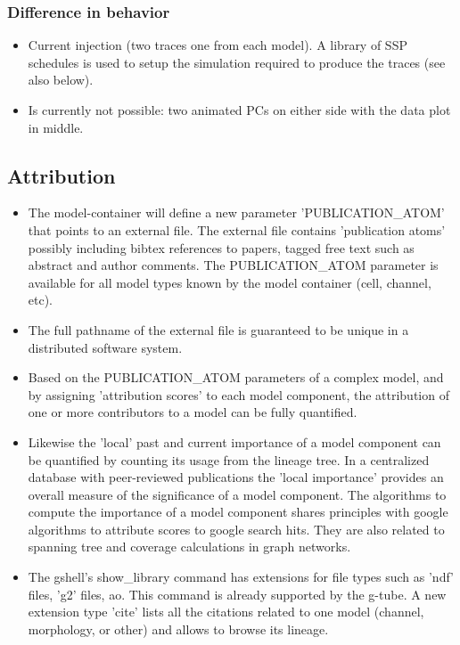 \documentclass[12pt]{article}
\begin{document}
\subsubsection{Difference in behavior}
\begin{itemize}
\item Current injection (two traces one from each model).  A library
  of SSP schedules is used to setup the simulation required to produce
  the traces (see also below).
\item Is currently not possible: two animated PCs on either side with
  the data plot in middle.
\end{itemize}


\subsection{Attribution}
\begin{itemize}
\item The model-container will define a new parameter
  'PUBLICATION\_ATOM' that points to an external file.  The external
  file contains 'publication atoms' possibly including bibtex
  references to papers, tagged free text such as abstract and author
  comments.  The PUBLICATION\_ATOM parameter is available for all
  model types known by the model container (cell, channel, etc).
\item The full pathname of the external file is guaranteed to be
  unique in a distributed software system.
\item Based on the PUBLICATION\_ATOM parameters of a complex model,
  and by assigning 'attribution scores' to each model component, the
  attribution of one or more contributors to a model can be fully
  quantified.
\item Likewise the 'local' past and current importance of a model
  component can be quantified by counting its usage from the lineage
  tree.  In a centralized database with peer-reviewed publications the
  'local importance' provides an overall measure of the significance
  of a model component.  The algorithms to compute the importance of a
  model component shares principles with google algorithms to
  attribute scores to google search hits.  They are also related to
  spanning tree and coverage calculations in graph networks.
\item The gshell's show\_library command has extensions for file types
  such as 'ndf' files, 'g2' files, ao.  This command is already
  supported by the g-tube.  A new extension type 'cite' lists all the
  citations related to one model (channel, morphology, or other) and
  allows to browse its lineage.
\end{itemize}
\end{document}
